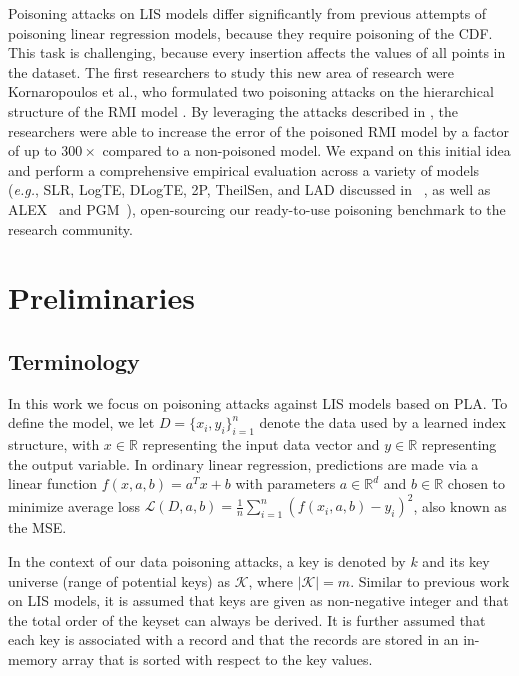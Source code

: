 \documentclass[sigconf]{acmart}
\newcommand{\eg}[0]{\emph{e.g.},\xspace}
\begin{document}
Poisoning attacks on \ac{LIS} models differ significantly from previous attempts of poisoning linear regression models, because they require poisoning of the \ac{CDF}. This task is challenging, because every insertion affects the values of all points in the dataset. The first researchers to study this new area of research were Kornaropoulos et al., who formulated two poisoning attacks on the hierarchical structure of the \ac{RMI} model \cite{RN415}. By leveraging the attacks described in \cite{RN415}, the researchers were able to increase the error of the poisoned \ac{RMI} model by a factor of up to $300\times$ compared to a non-poisoned model. We expand on this initial idea and perform a comprehensive empirical evaluation across a variety of models (\eg SLR, LogTE, DLogTE, 2P, TheilSen, and LAD discussed in ~\cite{RN696}, as well as ALEX~\cite{RN388} and PGM~\cite{RN400}), open-sourcing our ready-to-use poisoning benchmark to the research community.


\section{Preliminaries}

\subsection{Terminology}

In this work we focus on poisoning attacks against \ac{LIS} models based on \acf{PLA}. To define the model, we let $D=\{x_i,y_i\}_{i=1}^n$ denote the data used by a learned index structure, with $x\in \mathbb{R}$ representing the input data vector and $y\in\mathbb{R}$ representing the output variable. In ordinary linear regression, predictions are made via a linear function $f(x,a,b)=a^{T}x+b$ with parameters $a\in \mathbb{R}^d$ and $b\in \mathbb{R}$  
chosen to minimize average loss  $\mathcal{L}(D,a,b)=\frac{1}{n}\sum_{i=1}^{n}(f(x_i,a,b)-y_i)^2$, also known as the \acl{MSE}. 

In the context of our data poisoning attacks, a key is denoted by $k$ and its key universe (range of potential keys) as $\mathcal{K}$, where $|\mathcal{K}|=m$. Similar to previous work on \ac{LIS} models, it is assumed that keys are given as non-negative integer and that the total order of the keyset can always be derived. It is further assumed that each key is associated with a record and that the records are stored in an in-memory array that is sorted with respect to the key values. 
\end{document}
